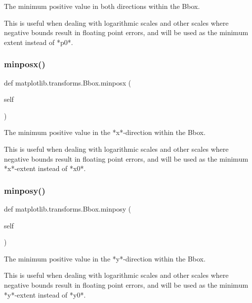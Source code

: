 \begin{DoxyVerb}The minimum positive value in both directions within the Bbox.

This is useful when dealing with logarithmic scales and other scales
where negative bounds result in floating point errors, and will be used
as the minimum extent instead of *p0*.
\end{DoxyVerb}
 \mbox{\label{classmatplotlib_1_1transforms_1_1Bbox_ab9b238d41fe7ea4137b59f668863916c}} 
\subsubsection{\texorpdfstring{minposx()}{minposx()}}
{\footnotesize\ttfamily def matplotlib.\+transforms.\+Bbox.\+minposx (\begin{DoxyParamCaption}\item[{}]{self }\end{DoxyParamCaption})}

\begin{DoxyVerb}The minimum positive value in the *x*-direction within the Bbox.

This is useful when dealing with logarithmic scales and other scales
where negative bounds result in floating point errors, and will be used
as the minimum *x*-extent instead of *x0*.
\end{DoxyVerb}
 \mbox{\label{classmatplotlib_1_1transforms_1_1Bbox_a449dfe16152ce524e14bec132a329d7f}} 
\subsubsection{\texorpdfstring{minposy()}{minposy()}}
{\footnotesize\ttfamily def matplotlib.\+transforms.\+Bbox.\+minposy (\begin{DoxyParamCaption}\item[{}]{self }\end{DoxyParamCaption})}

\begin{DoxyVerb}The minimum positive value in the *y*-direction within the Bbox.

This is useful when dealing with logarithmic scales and other scales
where negative bounds result in floating point errors, and will be used
as the minimum *y*-extent instead of *y0*.
\end{DoxyVerb}
 \mbox{\label{classmatplotlib_1_1transforms_1_1Bbox_aca4fc12bdaf117bc5ed72fa3e7a6fed1}} 
